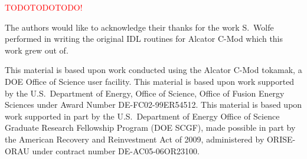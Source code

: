\documentclass[12pt,floatfix,showpacs]{revtex4-1}
\newcommand{\note}[1]{\textcolor{red}{#1}}
\newcommand{\gnote}[1]{\marginpar{\scriptsize\textcolor{red}{#1}}}
\begin{document}
\note{TODOTODOTODO!}


\begin{acknowledgements}
The authors would like to acknowledge their thanks for the work S.~Wolfe performed in writing the original IDL routines for Alcator C-Mod which this work grew out of.

This material is based upon work conducted using the Alcator C-Mod tokamak, a DOE Office of Science user facility.
This material is based upon work supported by the U.S.\ Department of Energy, Office of Science, Office of Fusion Energy Sciences under Award Number DE-FC02-99ER54512.
This material is based upon work supported in part by the U.S.\ Department of Energy Office of Science Graduate Research Fellowship Program (DOE SCGF), made possible in part by the American Recovery and Reinvestment Act of 2009, administered by ORISE-ORAU under contract number DE-AC05-06OR23100.

\gnote{Any more acknowledgements?}

\end{acknowledgements}



\end{document}
